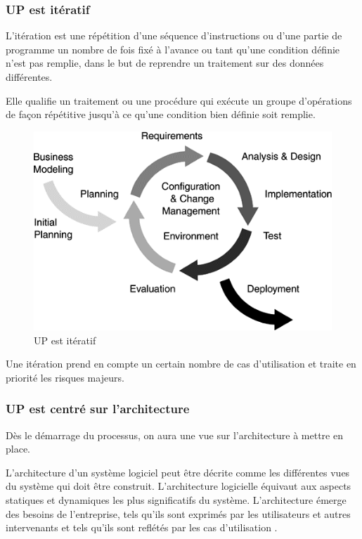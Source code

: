 \documentclass[12pt,a4paper]{report}
\begin{document}
\subsubsection{ UP est it\'{e}ratif}

\noindent \begin{flushleft}
	L'it\'{e}ration est une r\'{e}p\'{e}tition d'une s\'{e}quence d'instructions ou d'une partie de programme un nombre de fois fix\'{e} \`{a} l'avance ou tant qu'une condition d\'{e}finie n'est pas remplie, dans le but de reprendre un traitement sur des donn\'{e}es diff\'{e}rentes.
	
	\noindent Elle qualifie un traitement ou une proc\'{e}dure qui ex\'{e}cute un groupe d'op\'{e}rations de fa\c{c}on r\'{e}p\'{e}titive jusqu'\`{a} ce qu'une condition bien d\'{e}finie soit remplie.
	
	\noindent 
\end{flushleft}


\begin{figure}[H]
	\centering
	\includegraphics[width=0.8\linewidth]{image27.png}
	\caption{UP est it\'{e}ratif}
	
\end{figure}

\noindent \begin{flushleft}
	
	
	\noindent Une it\'{e}ration prend en compte un certain nombre de cas d'utilisation et traite en priorit\'{e} les risques majeurs.
\end{flushleft}


\subsubsection{ UP est centr\'{e} sur l'architecture}

\noindent \begin{flushleft}
	D\`{e}s le d\'{e}marrage du processus, on aura une vue sur l'architecture \`{a} mettre en place.
	
	\noindent L'architecture d'un syst\`{e}me logiciel peut \^{e}tre d\'{e}crite comme les diff\'{e}rentes vues du syst\`{e}me qui doit \^{e}tre construit. L'architecture logicielle \'{e}quivaut aux aspects statiques et dynamiques les plus significatifs du syst\`{e}me. L'architecture \'{e}merge des besoins de l'entreprise, tels qu'ils sont exprim\'{e}s par les utilisateurs et autres intervenants et tels qu'ils sont refl\'{e}t\'{e}s par les cas d'utilisation .
\end{flushleft}
\end{document}
